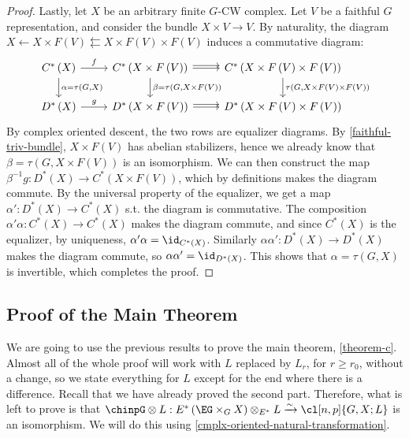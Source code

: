 \begin{proof}
	Lastly, let $X$ be an arbitrary finite $G$-CW complex.
	Let $V$ be a faithful $G$ representation, and consider the bundle $X \times V \to V$.
	By naturality, the diagram $X \leftarrow X \times F\left(V\right) \leftleftarrows X \times F\left(V\right) \times F\left(V\right)$ induces a commutative diagram:
	$$
	\begin{tikzcd}
		C^*\left(X\right) \arrow{r}{f} \arrow{d}{\alpha = \tau\left(G, X\right)}
		& C^*\left(X \times F\left(V\right)\right) \arrow{r}{} \arrow[shift left]{r}{} \arrow{d}{\beta = \tau\left(G, X \times F\left(V\right)\right)}
		& C^*\left(X \times F\left(V\right) \times F\left(V\right)\right) \arrow{d}{\tau\left(G, X \times F\left(V\right) \times F\left(V\right)\right)}
		\\
		D^*\left(X\right) \arrow{r}{g}
		& D^*\left(X \times F\left(V\right)\right) \arrow{r}{} \arrow[shift left]{r}{}
		& D^*\left(X \times F\left(V\right) \times F\left(V\right)\right)
	\end{tikzcd}
	$$
	By complex oriented descent, the two rows are equalizer diagrams.
	By \cref{faithful-triv-bundle}, $X \times F\left(V\right)$ has abelian stabilizers, hence we already know that $\beta = \tau\left(G, X \times F\left(V\right)\right)$ is an isomorphism.
	We can then construct the map $\beta^{-1} g: D^*\left(X\right) \to C^*\left(X \times F\left(V\right)\right)$, which by definitions makes the diagram commute.
	By the universal property of the equalizer, we get a map $\alpha': D^*\left(X\right) \to C^*\left(X\right)$ s.t. the diagram is commutative.
	The composition $\alpha' \alpha: C^*\left(X\right) \to C^*\left(X\right)$ makes the diagram commute, and since $C^*\left(X\right)$ is the equalizer, by uniqueness, $\alpha' \alpha = \id_{C^*\left(X\right)}$.
	Similarly $\alpha \alpha': D^*\left(X\right) \to D^*\left(X\right)$ makes the diagram commute, so $\alpha \alpha' = \id_{D^*\left(X\right)}$.
	This shows that $\alpha = \tau\left(G, X\right)$ is invertible, which completes the proof.
\end{proof}



\subsection{Proof of the Main Theorem}

We are going to use the previous results to prove the main theorem, \cref{theorem-c}.
Almost all of the whole proof will work with $L$ replaced by $L_r$, for $r \geq r_0$, without a change, so we state everything for $L$ except for the end where there is a difference.
Recall that we have already proved the second part.
Therefore, what is left to prove is that 
$\chinpG \otimes L: E^*\left(\EG \times_G X\right) \otimes_{E^*} L \xrightarrow{\sim} \cl[n,p]{G,X; L}$
is an isomorphism.
We will do this using \cref{cmplx-oriented-natural-transformation}.

